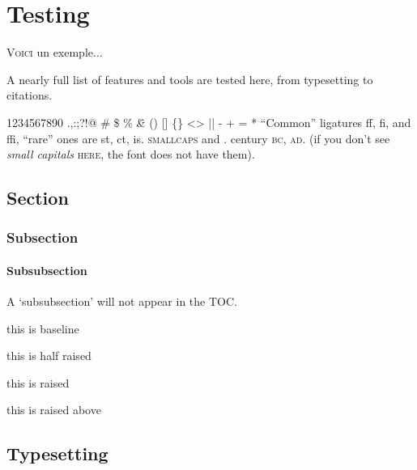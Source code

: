 \chapter{Testing}
\label{sec:test}

\lettrine[lines=4, lraise=0.1, nindent=0em, slope=-.5em]%
{\textcolor{PolyU}{V}}{oici} un exemple... 

\lettrine[lines=6, slope=0.5em, findent=-1em]%
{A}{} nearly full list of features and tools are tested here, from typesetting to citations. 

\blindtext[1]

\bigskip



1234567890 .,:;?!@ \# \$ \% \^ \& \* () [] \{\} <> || - + = * ``Common'' ligatures ff, fi, and ffi, ``rare'' ones are st, ct, is. \textsc{smallcaps} and .      century \textsc{bc}, \textsc{ad}. (if you don't see \emph{small capitals} \textsc{here}, the font does not have them).

\noindent{\color{black}\rule{\linewidth}{0.2mm}} 

\section{Section}

\subsection{Subsection}

\subsubsection{Subsubsection} 

A `subsubsection' will not appear in the TOC. 


\noindent{\color{black}\rule{0.25\linewidth}{0.2mm}} this is baseline

\noindent{\color{black}\rule[0.5ex]{0.25\linewidth}{0.2mm}} this is half raised

\noindent{\color{black}\rule[1ex]{0.25\linewidth}{0.2mm}} this is raised

\noindent{\color{black}\rule[1.5ex]{0.25\linewidth}{0.2mm}} this is raised above

\section{Typesetting}

